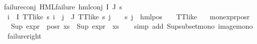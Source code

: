 \begin{isabellebody}
failure{\isacharunderscore}{\kern0pt}conj{\isacharcolon}{\kern0pt}\ {\isachardoublequoteopen}HML{\isacharunderscore}{\kern0pt}failure\ {\isacharparenleft}{\kern0pt}hml{\isacharunderscore}{\kern0pt}conj\ I\ J\ {\isasympsi}s{\isacharparenright}{\kern0pt}{\isachardoublequoteclose}\ \isanewline
{}\ {\isachardoublequoteopen}{\isacharparenleft}{\kern0pt}{\isasymforall}i\ {\isasymin}\ I{\isachardot}{\kern0pt}\ TT{\isacharunderscore}{\kern0pt}like\ {\isacharparenleft}{\kern0pt}{\isasympsi}s\ i{\isacharparenright}{\kern0pt}{\isacharparenright}{\kern0pt}\ {\isasymand}\ {\isacharparenleft}{\kern0pt}{\isasymforall}j\ {\isasymin}\ J{\isachardot}{\kern0pt}\ {\isacharparenleft}{\kern0pt}TT{\isacharunderscore}{\kern0pt}like\ {\isacharparenleft}{\kern0pt}{\isasympsi}s\ j{\isacharparenright}{\kern0pt}{\isacharparenright}{\kern0pt}\ {\isasymor}\ {\isacharparenleft}{\kern0pt}{\isasymexists}{\isasymalpha}\ {\isasymchi}{\isachardot}{\kern0pt}\ {\isacharparenleft}{\kern0pt}{\isacharparenleft}{\kern0pt}{\isasympsi}s\ j{\isacharparenright}{\kern0pt}\ {\isacharequal}{\kern0pt}\ hml{\isacharunderscore}{\kern0pt}pos\ {\isasymalpha}\ {\isasymchi}\ {\isasymand}\ {\isacharparenleft}{\kern0pt}TT{\isacharunderscore}{\kern0pt}like\ {\isasymchi}{\isacharparenright}{\kern0pt}{\isacharparenright}{\kern0pt}{\isacharparenright}{\kern0pt}{\isacharparenright}{\kern0pt}{\isachardoublequoteclose}\ \isanewline
\isanewline
{}\isamarkupfalse%
\ mon{\isacharunderscore}{\kern0pt}expr{\isacharunderscore}{\kern0pt}{}{\isacharunderscore}{\kern0pt}pos{\isacharunderscore}{\kern0pt}r{\isacharcolon}{\kern0pt}\ \isanewline
\ \ {\isachardoublequoteopen}Sup\ {\isacharparenleft}{\kern0pt}expr{\isacharunderscore}{\kern0pt}{}\ {\isacharbackquote}{\kern0pt}\ {\isacharparenleft}{\kern0pt}pos{\isacharunderscore}{\kern0pt}r\ xs{\isacharparenright}{\kern0pt}{\isacharparenright}{\kern0pt}\ {\isasymle}\ Sup\ {\isacharparenleft}{\kern0pt}expr{\isacharunderscore}{\kern0pt}{}\ {\isacharbackquote}{\kern0pt}\ xs{\isacharparenright}{\kern0pt}{\isachardoublequoteclose}\isanewline
%
\isadelimproof
\ \ %
\endisadelimproof
%
\isatagproof
{}\isamarkupfalse%
\ {\isacharparenleft}{\kern0pt}simp\ add{\isacharcolon}{\kern0pt}\ Sup{\isacharunderscore}{\kern0pt}subset{\isacharunderscore}{\kern0pt}mono\ image{\isacharunderscore}{\kern0pt}mono{\isacharparenright}{\kern0pt}%
\endisatagproof
{\isafoldproof}%
%
\isadelimproof
\isanewline
%
\endisadelimproof
\isanewline
{}\isamarkupfalse%
\ failure{\isacharunderscore}{\kern0pt}right{\isacharcolon}{\kern0pt}\isanewline

\end{isabellebody}
